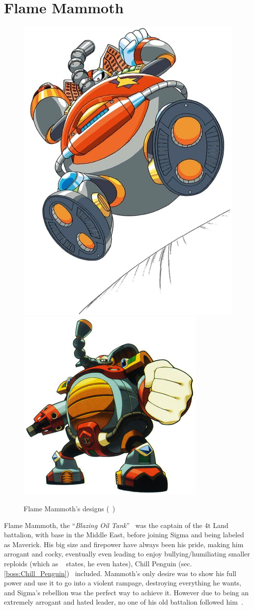 \section{Flame Mammoth}\label{boss:Flame_mammoth}
\begin{figure}[htp]
	\centering
	\includegraphics[width=0.3\linewidth]{figures/X1/Flame_mammoth/Flame_mammoth.jpg}
	\includegraphics[width=0.4\linewidth]{figures/X1/Flame_mammoth/MHXFlameMammoth.jpg}
	\caption{Flame Mammoth's designs (~\cite{book:MMX_Complete_art})}
\end{figure}
Flame Mammoth, the ``\textit{Blazing Oil Tank}''~\cite{book:MMX_Complete_art} was the captain of the 4t Land battalion, with base in the Middle East, before joining Sigma and being labeled as Maverick. His big size and firepower have always been his pride, making him arrogant and cocky, eventually even leading to enjoy bullying/humiliating smaller reploids (which as ~\cite{wayback:X_resources} states, he even hates), Chill Penguin (sec. \ref{boss:Chill_Penguin})~\cite{wiki:Flame_mammoth} included. Mammoth's only desire was to show his full power and use it to go into a violent rampage, destroying everything he wants, and Sigma's rebellion was the perfect way to achieve it. However due to being an extremely arrogant and hated leader, no one of his old battalion followed him~\cite{MHX:manual}.


